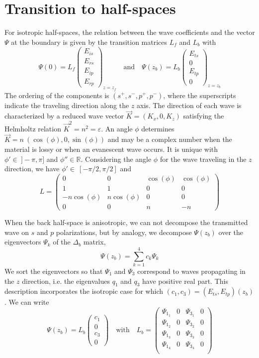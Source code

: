 \section{Transition to half-spaces}

For isotropic half-spaces, the relation between the wave coefficients and the vector $\Psi$ at the boundary is given by the transition matrices $L_f$ and $L_b$ with
$$
\Psi(0) = L_f 
\begin{pmatrix}
E_{is}\\
E_{rs}\\
E_{ip}\\
E_{rp}
\end{pmatrix}_{z=z_f}
\quad\mathrm{and} \quad 
\Psi(z_b) = L_b
\begin{pmatrix}
E_{ts}\\
0 \\
E_{tp}\\
0
\end{pmatrix}_{z=z_b}
$$
The ordering of the components is $(s^+,s^-,p^+,p^-)$, where the superscripts indicate the traveling direction along the $z$ axis.
The direction of each wave is characterized by a reduced wave vector $\vec K = (K_x,0,K_z)$ satisfying the Helmholtz relation $\vec K^2 = n^2 = \varepsilon$.
An angle $\phi$ determines $\vec K = n\ (\cos(\phi), 0, \sin(\phi))$ and may be a complex number when the material is lossy or when an evanescent wave occurs. 
It is unique with $\phi'\in\ ]-\pi,\pi]$ and $\phi''\in\mathbb{R}$.
Considering the angle $\phi$ for the wave traveling in the $z$ direction, we have $\phi'\in\ [-\pi/2,\pi/2]$ and 
$$
L = 
\begin{pmatrix}
0 & 0 & \cos(\phi) & \cos(\phi) \\
1 & 1 & 0 & 0 \\
-n \cos(\phi) & n \cos(\phi) & 0 & 0 \\
0 & 0 & n & -n 
\end{pmatrix}
$$

When the back half-space is anisotropic, we can not decompose the transmitted wave on $s$ and $p$ polarizations, but by analogy, we decompose $\Psi(z_b)$ over the eigenvectors $\Psi_k$ of the $\Delta_b$ matrix, 
$$
\Psi(z_b)= \sum_{k=1}^4 c_k \Psi_k
$$
We sort the eigenvectors so that $\Psi_1$ and $\Psi_3$ correspond to waves propagating in the $z$ direction, i.e. the eigenvalues $q_1$ and $q_3$ have positive real part.
This description incorporates the isotropic case for which $(c_1,c_3) = (E_{ts}, E_{tp})(z_b)$.
We can write 
$$
\Psi(z_b) = L_b
\begin{pmatrix}
c_1\\
0 \\
c_3\\
0
\end{pmatrix}
\quad\mathrm{with}\quad
L_b =
\begin{pmatrix} 
\Psi_{1_1} & 0 & \Psi_{3_1} & 0 \\ 
\Psi_{1_2} & 0 & \Psi_{3_2} & 0 \\ 
\Psi_{1_3} & 0 & \Psi_{3_3} & 0 \\ 
\Psi_{1_4} & 0 & \Psi_{3_4} & 0 \\ 
\end{pmatrix}
$$

